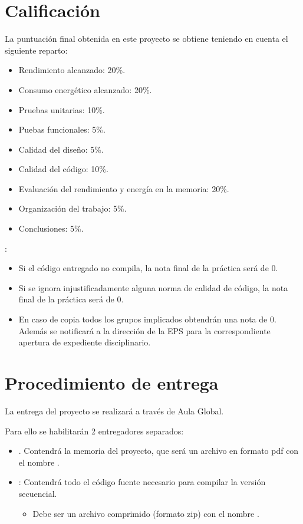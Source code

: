 \section{Calificación}

La puntuación final obtenida en este proyecto se obtiene teniendo en cuenta el siguiente reparto: 

\begin{itemize}
  \item Rendimiento alcanzado: 20\%.
  \item Consumo energético alcanzado: 20\%.
  \item Pruebas unitarias: 10\%.
  \item Puebas funcionales: 5\%.
  \item Calidad del diseño: 5\%.
  \item Calidad del código: 10\%.
  \item Evaluación del rendimiento y energía en la memoria: 20\%.
  \item Organización del trabajo: 5\%.
  \item Conclusiones: 5\%.  
\end{itemize}

:

\begin{itemize}
  \item Si el código entregado no compila, la nota final de la práctica será de 0. 
  \item Si se ignora injustificadamente alguna norma de calidad de código,
        la nota final de la práctica será de 0.
  \item En caso de copia todos los grupos implicados obtendrán una nota de 0.
        Además se notificará a la dirección de la EPS para la correspondiente
        apertura de expediente disciplinario.
\end{itemize}

\section{Procedimiento de entrega}

La entrega del proyecto se realizará a través de Aula Global.

Para ello se habilitarán 2 entregadores separados:

\begin{itemize}

\item {}. Contendrá la memoria del proyecto, que será
un archivo en formato pdf con el nombre .

\item {}: Contendrá todo el código fuente
necesario para compilar la versión secuencial.
\begin{itemize}
  \item Debe ser un archivo comprimido (formato zip) con el nombre
        .
\end{itemize}

\end{itemize}

